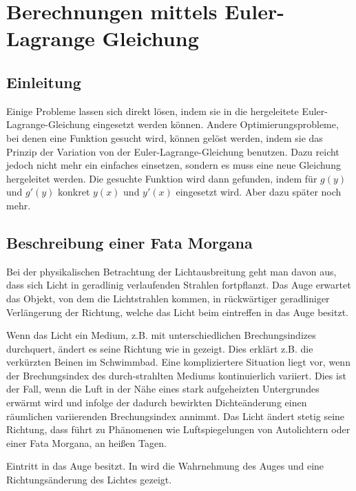 \section{Berechnungen mittels Euler-Lagrange Gleichung}
\subsection{Einleitung}
Einige Probleme lassen sich direkt lösen, indem sie in die hergeleitete Euler-Lagrange-Gleichung eingesetzt werden können. Andere Optimierungsprobleme, bei denen eine Funktion gesucht wird, können gelöst werden, indem sie das Prinzip der Variation von der Euler-Lagrange-Gleichung benutzen. Dazu reicht jedoch nicht mehr ein einfaches einsetzen, sondern es muss eine neue Gleichung hergeleitet werden. Die gesuchte Funktion wird dann gefunden, indem für $g(y)$ und $g'(y)$ konkret $y(x)$ und $y'(x)$ eingesetzt wird. Aber dazu später noch mehr.

\subsection{Beschreibung einer Fata Morgana}
\cite{fataEinleitung}
Bei der physikalischen Betrachtung der Lichtausbreitung geht man davon aus, dass sich Licht in
geradlinig verlaufenden Strahlen fortpflanzt. Das Auge erwartet das Objekt, von dem die Lichtstrahlen
kommen, in rückwärtiger geradliniger Verlängerung der Richtung, welche das Licht beim eintreffen in das Auge besitzt.

Wenn das Licht ein Medium, z.B. mit unterschiedlichen Brechungsindizes durchquert, ändert es seine Richtung wie in  gezeigt. Dies erklärt z.B. die verkürzten Beinen im Schwimmbad.
Eine kompliziertere Situation liegt vor, wenn der Brechungsindex des durch-strahlten Mediums kontinuierlich variiert. 
Dies ist der Fall, wenn die Luft in der Nähe eines stark aufgeheizten Untergrundes erwärmt
wird und infolge der dadurch bewirkten Dichteänderung einen räumlichen variierenden Brechungsindex annimmt. 
Das Licht ändert stetig seine Richtung, dass führt zu Phänomenen wie Luftspiegelungen von Autolichtern oder einer Fata Morgana, an heißen Tagen.

Eintritt in das Auge besitzt. In  wird die Wahrnehmung des Auges und eine Richtungsänderung des Lichtes gezeigt.

